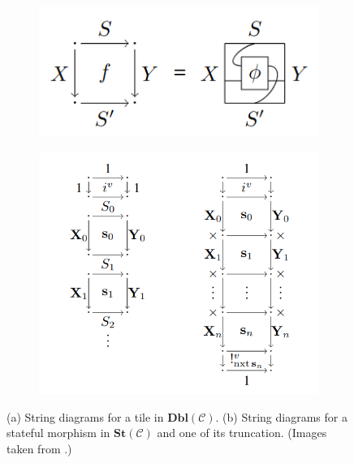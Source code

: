 \documentclass[11pt,a4paper,openright,twoside]{report}
\theoremstyle{plain}
\theoremstyle{definition}
\begin{document}
\begin{figure}[h]
  \begin{center}
    \begin{subfigure}[c]{0.3\textwidth}
      \includegraphics[width=\textwidth]{figures/tiles.png}
      \caption{}
    \end{subfigure}
    \begin{subfigure}[c]{0.45\textwidth}
      \includegraphics[width=\textwidth]{figures/stateful_morphism_sequences.png}
      \caption{}
    \end{subfigure}            
    \caption[Tiles and stateful morphisms]{(a) String diagrams for a tile in $\mathbf{Dbl}(\mathcal{C})$. (b) String diagrams for a stateful morphism in $\mathbf{St}(\mathcal{C})$ and one of its truncation. (Images taken from \cite{sprunger2019differentiable}.)}
    \label{fig: tiles}
  \end{center}
\end{figure}
\end{document}
